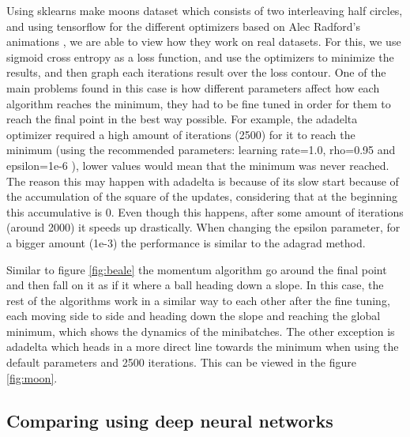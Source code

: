 \documentclass{article}
\begin{document}
Using sklearns make moons dataset \cite{scikit-learn} which consists of two interleaving half circles, and using tensorflow \cite{tensorflow2015-whitepaper} for the different optimizers based on Alec Radford's animations \cite{yuret_2015}, we are able to view how they work on real datasets. For this, we use sigmoid cross entropy as a loss function, and use the optimizers to minimize the results, and then graph each iterations result over the loss contour. One of the main problems found in this case is how different parameters affect how each algorithm reaches the minimum, they had to be fine tuned in order for them to reach the final point in the best way possible. For example, the adadelta optimizer required a high amount of iterations (2500) for it to reach the minimum (using the recommended parameters: learning rate=1.0, rho=0.95 and epsilon=1e-6 \cite{adadelta}), lower values would mean that the minimum was never reached. The reason this may happen with adadelta is because of its slow start because of the accumulation of the square of the updates, considering that at the beginning this accumulative is 0. Even though this happens, after some amount of iterations (around 2000) it speeds up drastically. When changing the epsilon parameter, for a bigger amount (1e-3) the performance is similar to the adagrad method.

Similar to figure \ref{fig:beale} the momentum algorithm go around the final point and then fall on it as if it where a ball heading down a slope. In this case, the rest of the algorithms work in a similar way to each other after the fine tuning, each moving side to side and heading down the slope and reaching the global minimum, which shows the dynamics of the minibatches. The other exception is adadelta which heads in a more direct line towards the minimum when using the default parameters and 2500 iterations. This can be viewed in the figure \ref{fig:moon}.

\subsection{Comparing using deep neural networks}
\end{document}
